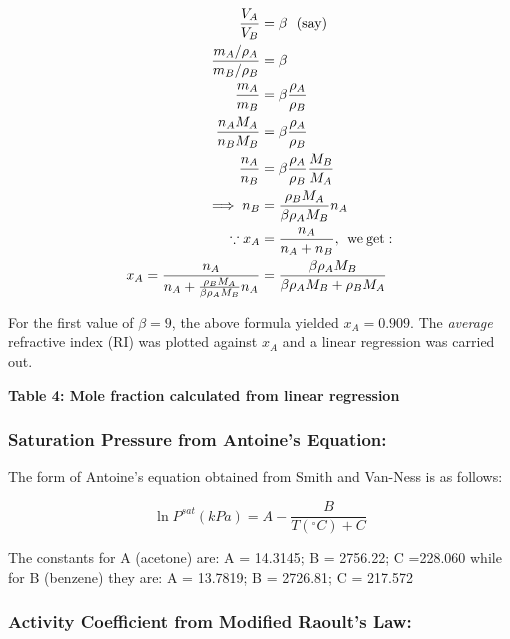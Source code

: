 \documentclass[11pt]{article}
\begin{document}
\begin{equation}
  \begin{split}
    \frac{V_A}{V_B}&=\beta \:\:\:(\rm say)\\
    \frac{m_A/\rho_A}{m_B/\rho_B}&=\beta\\
    \frac{m_A}{m_B}&=\beta\frac{\rho_A}{\rho_B}\\
    \frac{n_AM_A}{n_BM_B}&=\beta\frac{\rho_A}{\rho_B}\\
    \frac{n_A}{n_B}&=\beta\frac{\rho_A}{\rho_B}\frac{M_B}{M_A}\\
    \implies n_B&=\frac{\rho_BM_A}{\beta\rho_AM_B}n_A\\
    \because x_A&=\frac{n_A}{n_A+n_B},\:\:\rm we\: get:\\
    x_A = \frac{n_A}{n_A+\frac{\rho_BM_A}{\beta\rho_AM_B}n_A}&=\frac{\beta\rho_AM_B}{\beta\rho_AM_B+\rho_BM_A}
  \end{split}
\end{equation}

For the first value of \(\beta=9\), the above formula yielded
\(x_A=0.909\). The \emph{average} refractive index (RI) was plotted
against \(x_A\) and a linear regression was carried out.

\textbf{Table 4: Mole fraction calculated from linear regression}

\begin{center}
\end{center}

\hypertarget{saturation-pressure-from-antoines-equation}{%
  \subsubsection{Saturation Pressure from Antoine's
    Equation:}\label{saturation-pressure-from-antoines-equation}}

The form of Antoine's equation obtained from Smith and Van-Ness is as
follows:

\begin{equation}
  \ln{P^{sat}}(kPa)=A-\frac{B}{T(^{\circ}C)+C}
\end{equation}

The constants for A (acetone) are: A = 14.3145; B = 2756.22; C =228.060
while for B (benzene) they are: A = 13.7819; B = 2726.81; C = 217.572

\hypertarget{activity-coefficient-from-modified-raoults-law}{%
  \subsubsection{Activity Coefficient from Modified Raoult's
    Law:}\label{activity-coefficient-from-modified-raoults-law}}
\end{document}
